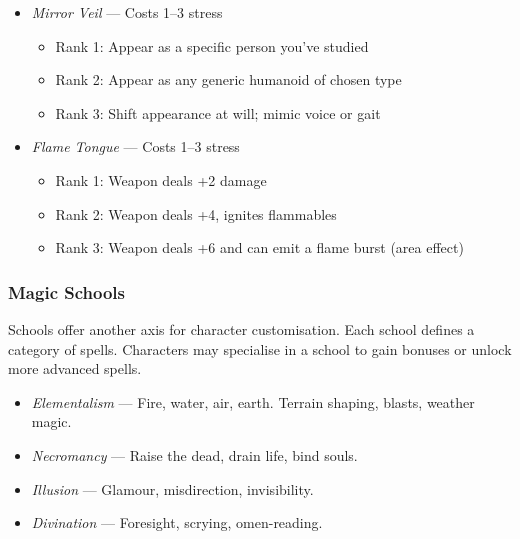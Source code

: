 \begin{WyrdExample}
    \begin{itemize}
        \item \textit{Mirror Veil} — Costs 1–3 stress
        \begin{itemize}
            \item Rank 1: Appear as a specific person you've studied
            \item Rank 2: Appear as any generic humanoid of chosen type
            \item Rank 3: Shift appearance at will; mimic voice or gait
        \end{itemize}
        
        \item \textit{Flame Tongue} — Costs 1–3 stress
        \begin{itemize}
            \item Rank 1: Weapon deals +2 damage
            \item Rank 2: Weapon deals +4, ignites flammables
            \item Rank 3: Weapon deals +6 and can emit a flame burst (area effect)
        \end{itemize}
    \end{itemize}
\end{WyrdExample}

\subsubsection{Magic Schools}

Schools offer another axis for character customisation. Each school defines a category of spells. Characters may specialise in a school to gain bonuses or unlock more advanced spells.

\begin{WyrdExample}
    \begin{itemize}
        \item \textit{Elementalism} — Fire, water, air, earth. Terrain shaping, blasts, weather magic.
        \item \textit{Necromancy} — Raise the dead, drain life, bind souls.
        \item \textit{Illusion} — Glamour, misdirection, invisibility.
        \item \textit{Divination} — Foresight, scrying, omen-reading.
    \end{itemize}
\end{WyrdExample}

